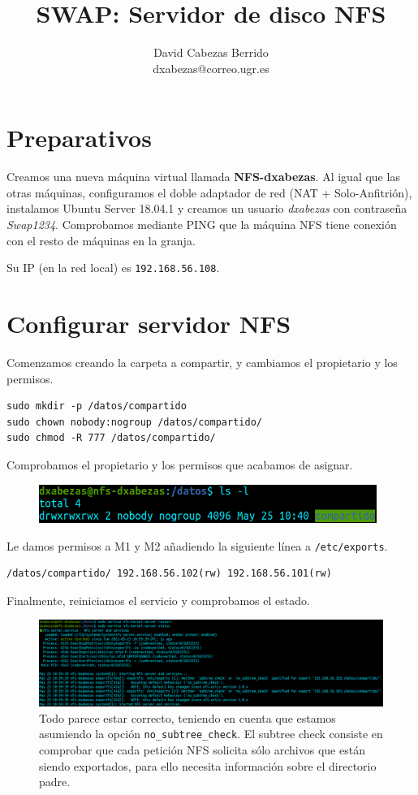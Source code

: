 \documentclass{article}
\title{\Huge SWAP: Servidor de disco NFS\vspace{10mm}}
\author{\huge David Cabezas Berrido \vspace{10mm} \\ 
  \huge dxabezas@correo.ugr.es \vspace{10mm}}
\begin{document}
\maketitle
\tableofcontents
\newpage

\section{Preparativos}

Creamos una nueva máquina virtual llamada \textbf{NFS-dxabezas}. Al igual que las otras máquinas, configuramos el doble adaptador de red
(NAT + Solo-Anfitrión), instalamos Ubuntu Server 18.04.1 y creamos un usuario \emph{dxabezas} con contraseña \emph{Swap1234}.
Comprobamos mediante PING que la máquina NFS tiene conexión con el resto de máquinas en la granja.

Su IP (en la red local) es \texttt{192.168.56.108}.

\section{Configurar servidor NFS}

Comenzamos creando la carpeta a compartir, y cambiamos el propietario y los permisos.

\begin{Verbatim}
sudo mkdir -p /datos/compartido
sudo chown nobody:nogroup /datos/compartido/
sudo chmod -R 777 /datos/compartido/
\end{Verbatim}

Comprobamos el propietario y los permisos que acabamos de asignar.

\begin{figure}[H]
	\centering
	\includegraphics[width=110mm]{imgs/compartido-ls-l}
\end{figure}

Le damos permisos a M1 y M2 añadiendo la siguiente línea a \texttt{/etc/exports}.
\begin{Verbatim}
/datos/compartido/ 192.168.56.102(rw) 192.168.56.101(rw)
\end{Verbatim}

Finalmente, reiniciamos el servicio y comprobamos el estado.
\begin{figure}[H]
	\centering
	\includegraphics[width=180mm]{imgs/status}
	\caption{Todo parece estar correcto, teniendo en cuenta que estamos asumiendo la opción \texttt{no\_subtree\_check}. El subtree check consiste
	en comprobar que cada petición NFS solicita sólo archivos que están siendo exportados, para ello necesita información sobre el directorio
	padre.}
\end{figure}
\end{document}
